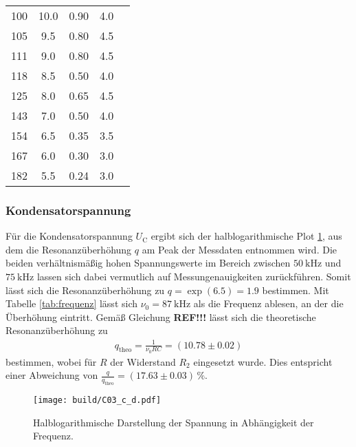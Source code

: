 \begin{table}[H]
\begin{tabular}{S[table-format = 3.0] S[table-format= 2.1] S[table-format = 1.2] S[table-format = 1.1] S[table-format = 2.2]}
        100 & 10.0 & 0.90 & 4.0 &  \\
        105 &  9.5 & 0.80 & 4.5 &  \\
        111 &  9.0 & 0.80 & 4.5 &  \\
        118 &  8.5 & 0.50 & 4.0 &  \\
        125 &  8.0 & 0.65 & 4.5 &  \\
        143 &  7.0 & 0.50 & 4.0 &  \\
        154 &  6.5 & 0.35 & 3.5 &  \\
        167 &  6.0 & 0.30 & 3.0 &  \\
        182 &  5.5 & 0.24 & 3.0 &  \\
        \bottomrule
    \end{tabular}
\end{table}
\noindent

\subsubsection{Kondensatorspannung}
Für die Kondensatorspannung $U_\text{C}$ ergibt sich der halblogarithmische Plot \ref{fig:plot_spannung}, aus dem die 
Resonanzüberhöhung $q$ am Peak der Messdaten entnommen wird.
Die beiden verhältnismäßig hohen Spannungswerte im Bereich zwischen $\qty{50}{\kilo\hertz}$ und $\qty{75}{\kilo\hertz}$
lassen sich dabei vermutlich auf Messungenauigkeiten zurückführen.
Somit lässt sich die Resonanzüberhöhung zu $q = \exp(6.5) = 1.9$ bestimmen. 
Mit Tabelle \ref{tab:frequenz} lässt sich $\nu_0 = \qty{87}{\kilo\hertz}$ als die Frequenz ablesen, an der die Überhöhung eintritt.
Gemäß Gleichung \textbf{REF!!!} lässt sich die theoretische Resonanzüberhöhung zu 
\begin{align}
    q_\text{theo} = \frac{1}{\nu_0 R C} = (\num{10.78} \pm \num{0.02})
\end{align}
bestimmen, wobei für $R$ der Widerstand $R_2$ eingesetzt wurde.
Dies entspricht einer Abweichung von $\frac{q}{q_\text{theo}} = (\num{17.63} \pm \num{0.03}) \, \%$.
\begin{figure}[H]
    \centering
    \texttt{[image: build/C03\_c\_d.pdf]}
    \caption{Halblogarithmische Darstellung der Spannung in Abhängigkeit der Frequenz.}
    \label{fig:plot_spannung}
\end{figure}

